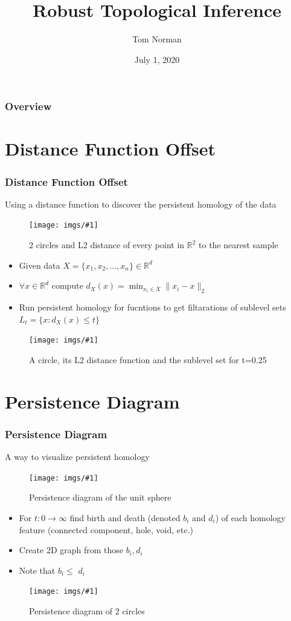 \documentclass[9pt, dvipsnames]{beamer} %
\title{Robust Topological Inference}
\author[048985]{Tom Norman}
\date{July 1, 2020}
\def\norm#1{\mathopen\| #1 \mathclose\|}%
\newcommand {\image}[3] {
    \begin{figure}
        \begin{center}
		\texttt{[image: imgs/\#1]}
		\caption{#2}
        \end{center}
    \end{figure}
}
\begin{document}
    \everymath{\displaystyle}

    \begin{frame}
        \titlepage
    \end{frame}

    \begin{frame}
        \frametitle{\textbf{Overview}}
        \tableofcontents
    \end{frame}


    \section{Distance Function Offset}\label{sec:dfo}
    \begin{frame}
        \frametitle{\textbf{Distance Function Offset}}
	\centerline{Using a distance function to discover the persistent homology of the data}
	\image{only_distance.png}{2 circles and L2 distance of every point in $\mathbb{R}^2$ to the nearest sample}{0.9}
    \end{frame}
    \begin{frame}
	\begin{itemize}
		\item
			Given data $X = \{ x_1, x_2, ..., x_n \} \in \mathbb{R}^d$
		\item
			$\forall x \in \mathbb{R}^d \text{ compute } d_X(x) = \min_{x_i \in X} \norm{x_i - x}_2$
		\item
			Run persistent homology for fucntions to get filtarations of sublevel sets $L_t = \{ x : d_X(x) \leq t \}$
	\end{itemize}
	\image{sublevel_demo.jpg}{A circle, its L2 distance function and the sublevel set for t=0.25}{0.6}
	\end{frame}

	\section{Persistence Diagram}\label{sec:pd}
	\begin{frame}
		\frametitle{\textbf{Persistence Diagram}}
		\centerline{A way to visualize persistent homology}
		\image{sphere_ph.png}{Persistence diagram of the unit sphere}{0.9}
	\end{frame}
	\begin{frame}
		\begin{itemize}
			\item
				For $t: 0 \to \infty$ find birth and death (denoted $b_i$ and $d_i$) of each homology feature (connected component, hole, void, etc.)
			\item
				Create 2D graph from those $b_i, d_i$
			\item
				Note that $b_i \leq$ $d_i$
		\end{itemize}

		\image{distFct_ph_demo.png}{Persistence diagram of 2 circles}{0.6}
	\end{frame}
\end{document}
